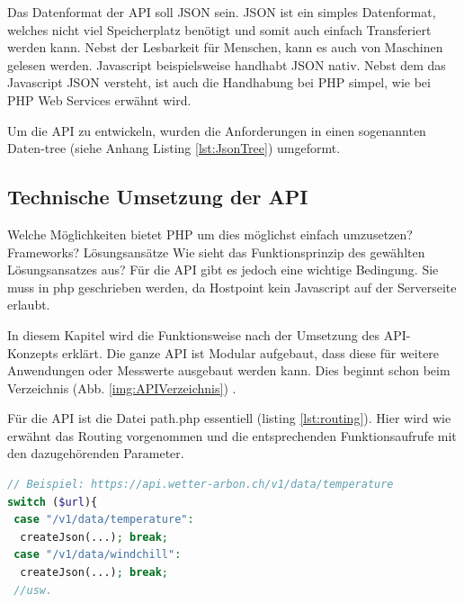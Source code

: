 Das Datenformat der API soll JSON sein. JSON ist ein simples Datenformat, welches nicht viel Speicherplatz benötigt und somit auch einfach Transferiert werden kann. Nebst der Lesbarkeit für Menschen, kann es auch von Maschinen gelesen werden. Javascript beispielsweise handhabt JSON nativ. Nebst dem das Javascript JSON versteht, ist auch die Handhabung bei PHP simpel, wie bei PHP Web Services \cite{LornaJaneMitchell2013oreilly} erwähnt wird.

Um die API zu entwickeln, wurden die Anforderungen in einen sogenannten Daten-tree (siehe Anhang Listing \ref{lst:JsonTree}) umgeformt.

\subsection{Technische Umsetzung der API}
Welche Möglichkeiten bietet PHP um dies möglichst einfach umzusetzen? Frameworks? Lösungsansätze
Wie sieht das Funktionsprinzip des gewählten Lösungsansatzes aus?
 Für die API gibt es jedoch eine wichtige Bedingung. Sie muss in php geschrieben werden, da Hostpoint kein Javascript auf der Serverseite erlaubt.



In diesem Kapitel wird die Funktionsweise nach der Umsetzung des API-Konzepts erklärt. Die ganze API ist Modular aufgebaut, dass diese für weitere Anwendungen oder Messwerte ausgebaut werden kann. Dies beginnt schon beim Verzeichnis (Abb. \ref{img:APIVerzeichnis}) .

Für die API ist die Datei path.php essentiell (listing \ref{lst:routing}). Hier wird wie erwähnt das Routing vorgenommen und die entsprechenden Funktionsaufrufe mit den dazugehörenden Parameter.

\vspace{3mm}
\begin{lstlisting}[label=lst:routing,caption=Routing der URL auf die richtige DB-Abfrage, language=php, style=php]
// Beispiel: https://api.wetter-arbon.ch/v1/data/temperature
switch ($url){
 case "/v1/data/temperature":
  createJson(...); break;
 case "/v1/data/windchill":
  createJson(...); break;
 //usw.
\end{lstlisting}
\vspace{3mm}

